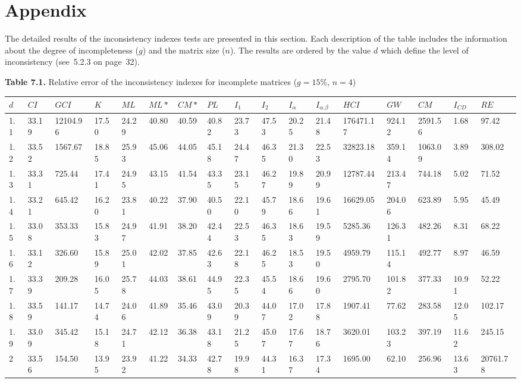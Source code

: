 \chapter{Appendix}

The detailed results of the inconsistency indexes tests are presented in this section. Each description of the table includes the information about the degree of incompleteness ($g$) and the matrix size ($n$). The results are ordered by the value $d$ which define the level of inconsistency (see~5.2.3 on page~32).





\newpage
\textbf{Table 7.1.} Relative error of the inconsistency indexes for incomplete matrices ($g=15\%$, $n=4$)
\begin{adjustbox}{angle=90}
  \begin{center}
    \small{
    \begin{tabular}{|l|llllllllllllllll|}
      \hline $d$&$CI$&$	\textit{GCI}$&$K$&$ML$&$ML*$&$CM*$&$PL$&$I_1$&$I_2$&$I_{\alpha}$&$I_{\alpha.\beta}$&$HCI$&$GW$&$CM$&$I_{CD}$&$RE$\\ \hline \hline
1.1&33.19&12104.96&17.50&24.29&40.80&40.59&40.82&23.73&47.53&20.25&21.48&176471.17&924.12&2591.56&1.68&97.42  \\ 
1.2&33.52&1567.67&18.85&25.93&45.06&44.05&45.18&24.47&46.35&21.30&22.53&32823.18&359.14&1063.09&3.89&308.02  \\ 
1.3&33.31&725.44&17.41&24.95&43.15&41.54&43.35&23.15&46.27&19.89&20.99&12787.44&213.47&744.18&5.02&71.52  \\ 
1.4&33.21&645.42&16.20&23.81&40.22&37.90&40.50&22.10&45.79&18.66&19.61&16629.05&204.06&623.89&5.95&45.49  \\ 
1.5&33.08&353.33&15.83&24.97&41.91&38.20&42.44&22.53&46.35&18.63&19.59&5285.36&126.31&482.26&8.31&68.22  \\ 
1.6&33.12&326.60&15.89&25.01&42.02&37.85&42.63&22.18&46.25&18.53&19.50&4959.79&115.14&492.77&8.97&46.59  \\ 
1.7&33.39&209.28&16.05&25.78&44.03&38.61&44.95&22.35&45.54&18.66&19.60&2795.70&101.82&377.33&10.91&52.22  \\ 
1.8&33.59&141.17&14.74&24.06&41.89&35.46&43.09&20.39&44.07&17.02&17.88&1907.41&77.62&283.58&12.05&102.17  \\ 
1.9&33.09&345.42&15.18&24.71&42.12&36.38&43.18&21.25&45.07&17.67&18.76&3620.01&103.23&397.19&11.62&245.15  \\ 
2&33.56&154.50&13.95&23.92&41.22&34.33&42.78&19.98&44.31&16.37&17.34&1695.00&62.10&256.96&13.63&20761.78  \\ 

\end{tabular}}
\end{center}
\end{adjustbox}
